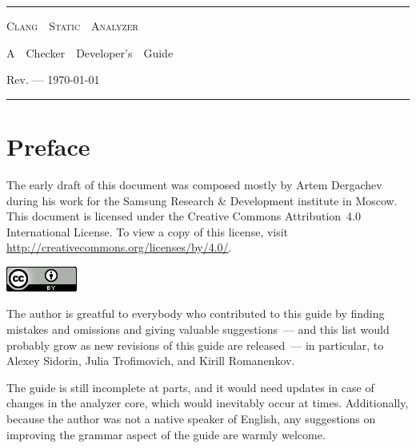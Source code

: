 \documentclass[a4paper,12pt]{article}
\begin{document}
\begin{center}
\hrule\bigskip\bigskip
{\Huge\textsc{Clang\ \ Static\ \ Analyzer}}
\bigskip

{\Large A\ \ Checker\ \ Developer's\ \ Guide}
\bigskip

{Rev. --- \today}
\bigskip\bigskip\hrule

\end{center}

\newpage
\tableofcontents

\newpage
\section{Preface}

The early draft of this document was composed mostly by Artem Dergachev during his work for the Samsung Research \& Development institute in Moscow. This document is licensed under the Creative Commons Attribution~4.0 International License. To view a copy of this license, visit \url{http://creativecommons.org/licenses/by/4.0/}.
{\begin{center}\includegraphics{license.png}\end{center}}

The author is greatful to everybody who contributed to this guide by finding mistakes and omissions and giving valuable suggestions~--- and this list would probably grow as new revisions of this guide are released~--- in particular, to Alexey Sidorin, Julia Trofimovich, and Kirill Romanenkov.

The guide is still incomplete at parts, and it would need updates in case of changes in the analyzer core, which would inevitably occur at times. Additionally, because the author was not a native speaker of English, any suggestions on improving the grammar aspect of the guide are warmly welcome.
\end{document}

